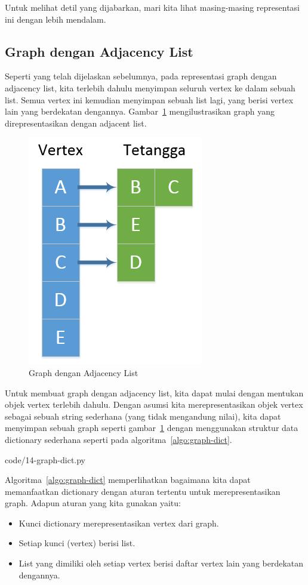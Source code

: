 Untuk melihat detil yang dijabarkan, mari kita lihat masing-masing representasi ini dengan lebih mendalam.

\subsection{Graph dengan Adjacency List}

Seperti yang telah dijelaskan sebelumnya, pada representasi graph dengan adjacency list, kita terlebih dahulu menyimpan seluruh vertex ke dalam sebuah list. Semua vertex ini kemudian menyimpan sebuah list lagi, yang berisi vertex lain yang berdekatan dengannya. Gambar~\ref{fig:graph-adj-list} mengilustrasikan graph yang direpresentasikan dengan adjacent list.

\begin{figure}[h!]
    \centering
    \includegraphics[width=.3\textwidth,keepaspectratio]{fig/Graph-AdjacencyList.png}%
	\caption{Graph dengan Adjacency List}%
	\label{fig:graph-adj-list}%
\end{figure}

\FloatBarrier

Untuk membuat graph dengan adjacency list, kita dapat mulai dengan mentukan objek vertex terlebih dahulu. Dengan asumsi kita merepresentasikan objek vertex sebagai sebuah string sederhana (yang tidak mengandung nilai), kita dapat menyimpan sebuah graph seperti gambar~\ref{fig:graph-adj-list} dengan menggunakan struktur data dictionary sederhana seperti pada algoritma~\ref{algo:graph-dict}.


                {code/14-graph-dict.py}

Algoritma~\ref{algo:graph-dict} memperlihatkan bagaimana kita dapat memanfaatkan dictionary dengan aturan tertentu untuk merepresentasikan graph. Adapun aturan yang kita gunakan yaitu:

\begin{itemize}
    \item Kunci dictionary merepresentasikan vertex dari graph.
    \item Setiap kunci (vertex) berisi list.
    \item List yang dimiliki oleh setiap vertex berisi daftar vertex lain yang berdekatan dengannya.
\end{itemize}

